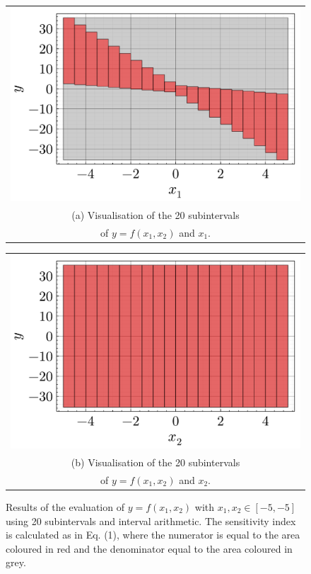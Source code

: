 \documentclass[twocolumn]{rps-esrel2022}
\begin{document}
\begin{figure}[!b]
	\centering
	\begin{tabular}{@{}c@{}}
	  \includegraphics[width=\linewidth]{figures/example_boxes_1.pdf} \\[\abovecaptionskip]
	  \small (a) Visualisation of the 20 subintervals\\
	  \small of $y=f(x_1,x_2)$ and $x_1$.
	\end{tabular}

	\vspace{\floatsep}

	\begin{tabular}{@{}c@{}}
	  \includegraphics[width=\linewidth]{figures/example_boxes_2.pdf} \\[\abovecaptionskip]
	  \small (b) Visualisation of the 20 subintervals\\
	  \small of $y=f(x_1,x_2)$ and $x_2$.
	\end{tabular}

	\caption{Results of the evaluation of $y=f(x_1,x_2)$ with $x_1,x_2 \in [-5,-5]$ using 20 subintervals and interval arithmetic.
	The sensitivity index is calculated as in Eq. (1), where the numerator is equal to the area coloured in red and the denominator
	equal to the area coloured in grey.}
	\label{fig:myfig}
\end{figure}
\end{document}
